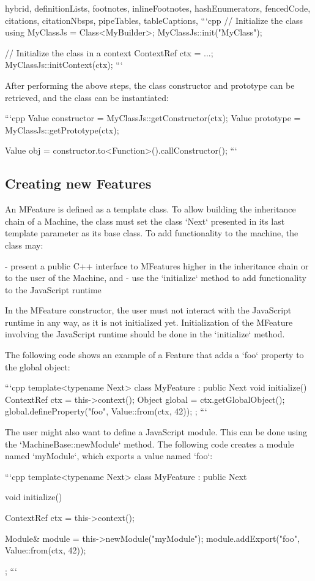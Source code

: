 \begin{markdown*}{%
  hybrid,
  definitionLists,
  footnotes,
  inlineFootnotes,
  hashEnumerators,
  fencedCode,
  citations,
  citationNbsps,
  pipeTables,
  tableCaptions,
}
```cpp
// Initialize the class
using MyClassJs = Class<MyBuilder>;
MyClassJs::init("MyClass");

// Initialize the class in a context
ContextRef ctx = ...;
MyClassJs::initContext(ctx);
```

After performing the above steps, the class constructor and prototype can be retrieved, and the class can be instantiated:

```cpp
Value constructor = MyClassJs::getConstructor(ctx);
Value prototype = MyClassJs::getPrototype(ctx);

Value obj = constructor.to<Function>().callConstructor();
```

\subsection{Creating new Features}

An MFeature is defined as a template class. To allow building the inheritance chain of a Machine, the class must set the class `Next` presented in its last template parameter as its base class. To add functionality to the machine, the class may:

  - present a public C++ interface to MFeatures higher in the inheritance chain or to the user of the Machine, and
  - use the `initialize` method to add functionality to the JavaScript runtime

In the MFeature constructor, the user must not interact with the JavaScript runtime in any way, as it is not initialized yet. Initialization of the MFeature involving the JavaScript runtime should be done in the `initialize` method.

The following code shows an example of a Feature that adds a `foo` property to the global object:

```cpp
template<typename Next>
class MyFeature : public Next {
  void initialize() {
    ContextRef ctx = this->context();
    Object global = ctx.getGlobalObject();
    global.defineProperty("foo", Value::from(ctx, 42));
  }
};
```

The user might also want to define a JavaScript module. This can be done using the `MachineBase::newModule` method. The following code creates a module named `myModule`, which exports a value named `foo`:

```cpp
template<typename Next>
class MyFeature : public Next {
  void initialize() {
    ContextRef ctx = this->context();

    Module& module = this->newModule("myModule");
    module.addExport("foo", Value::from(ctx, 42));
  }
};
```


\end{markdown*}
